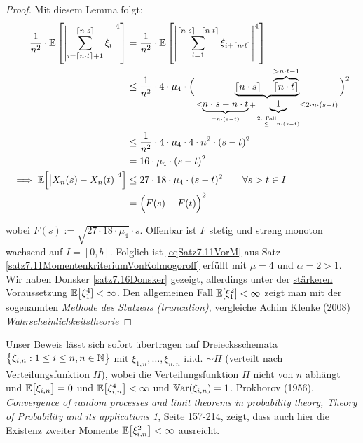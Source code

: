 \begin{proof}
	Mit diesem Lemma folgt:
	\begin{align*}
		\frac{1}{n^2}\cdot\mathbb{E}\left[\left|\sum\limits_{i=\lceil n\cdot t\rceil+1}^{\lceil n\cdot s\rceil}\xi_i\right|^4\right]
		&=
		\frac{1}{n^2}\cdot\mathbb{E}\left[\left|\sum\limits_{i=1}^{\lceil n\cdot s\rceil-\lceil n\cdot t\rceil}\xi_{i+\lceil n\cdot t\rceil}\right|^4\right]\\
		&\leq
		\frac{1}{n^2}\cdot 4\cdot\mu_4\cdot\Big(\underbrace{\lceil n\cdot s\rceil-\overbrace{\lceil n\cdot t\rceil}^{>n\cdot t-1}}_{\leq\underbrace{ n\cdot s-n\cdot t}_{=n\cdot(s-t)}+\underbrace{1}_{\stackrel{\text{2. Fall}}{\leq}n\cdot(s-t)}\leq2\cdot n\cdot(s-t)}\Big)^2\\
		&\leq
		\frac{1}{n^2}\cdot 4\cdot\mu_4\cdot 4\cdot n^2\cdot(s-t)^2\\
		&=16\cdot\mu_4\cdot(s-t)^2\\
		\implies
		\mathbb{E}\Big[\big|X_n(s)-X_n(t)\big|^4\Big]
		&\leq 27\cdot18\cdot\mu_4\cdot(s-t)^2\qquad\forall s>t\in I\\
		&=\Big(F(s)-F(t)\Big)^2
	\end{align*}

	wobei $F(s):=\sqrt{27\cdot18\cdot\mu_4}\cdot s$. 
	Offenbar ist $F$ stetig und streng monoton wachsend auf $I=[0,b]$.
	Folglich ist \eqref{eqSatz7.11VorM} aus Satz \ref{satz7.11MomentenkriteriumVonKolmogoroff} erfüllt mit $\mu=4$ und $\alpha=2>1$.\nl
	Wir haben Donsker \ref{satz7.16Donsker} gezeigt, allerdings unter der \ul{stärkeren} Voraussetzung $\mathbb{E}\big[\xi_1^4]<\infty$. 
	Den allgemeinen Fall $\mathbb{E}[\xi_1^2]<\infty$ zeigt man mit der sogenannten \textit{Methode des Stutzens (truncation)}, 
	vergleiche Achim Klenke (2008) \textit{Wahrscheinlichkeitstheorie}
\end{proof}


\setcounter{satz}{15}
\begin{bemerkungnr}\label{bemerkung7.16Einhalb} %
	Unser Beweis lässt sich sofort übertragen auf Dreiecksschemata\\ 
	$\big\lbrace\xi_{i,n}:1\leq i\leq n,n\in\mathbb{N}\big\rbrace$ mit $\xi_{1,n},\ldots,\xi_{n,n}$ i.i.d. $\sim H$ (verteilt nach Verteilungsfunktion $H$), 
	wobei die Verteilungsfunktion $H$ nicht von $n$ abhängt und $\mathbb{E}\big[\xi_{i,n}\big]=0$ und $\mathbb{E}\big[\xi_{i,n}^4\big]<\infty$ und $\mathbb{V}\text{ar}(\xi_{i,n})=1$. \nl
	Prokhorov (1956), \textit{Convergence of random processes and limit theorems in probability theory, Theory of Probability and its applications 1},
	Seite 157-214, zeigt, dass auch hier die Existenz zweiter Momente $\mathbb{E}\big[\xi_{i,n}^2\big]<\infty$ ausreicht.
\end{bemerkungnr}


